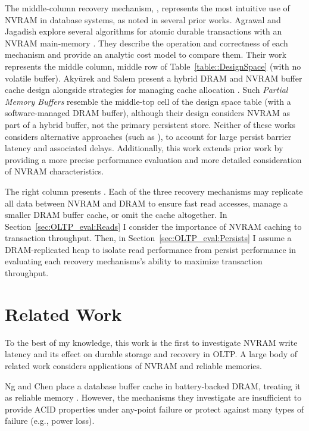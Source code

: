 The middle-column recovery mechanism, \InPlace, represents the most intuitive use of NVRAM in database systems, as noted in several prior works.
Agrawal and Jagadish explore several algorithms for atomic durable transactions with an NVRAM main-memory \cite{AgrawalJagadish89}.
They describe the operation and correctness of each mechanism and provide an analytic cost model to compare them.
Their work represents the middle column, middle row of Table~\ref{table::DesignSpace} (\InPlace with no volatile buffer).
Aky\"{u}rek and Salem present a hybrid DRAM and NVRAM buffer cache design alongside strategies for managing cache allocation \cite{SalemAkyrek95}.
Such \emph{Partial Memory Buffers} resemble the middle-top cell of the design space table (\InPlace with a software-managed DRAM buffer), although their design considers NVRAM as part of a hybrid buffer, not the primary persistent store.
Neither of these works considers alternative approaches (such as \GroupCommit), to account for large persist barrier latency and associated delays.
Additionally, this work extends prior work by providing a more precise performance evaluation and more detailed consideration of NVRAM characteristics.

The right column presents \GroupCommit.
Each of the three recovery mechanisms may replicate all data between NVRAM and DRAM to ensure fast read accesses, manage a smaller DRAM buffer cache, or omit the cache altogether.
In Section~\ref{sec:OLTP_eval:Reads} I consider the importance of NVRAM caching to transaction throughput.
Then, in Section~\ref{sec:OLTP_eval:Persists} I assume a DRAM-replicated heap to isolate read performance from persist performance in evaluating each recovery mechanisms's ability to maximize transaction throughput.

\section{Related Work}
\label{sec:OLTP_design:RelatedWork}
To the best of my knowledge, this work is the first to investigate NVRAM write latency and its effect on durable storage and recovery in OLTP.
A large body of related work considers applications of NVRAM and reliable memories.

Ng and Chen place a database buffer cache in battery-backed DRAM, treating it as reliable memory \cite{NgChen97}.
However, the mechanisms they investigate are insufficient to provide ACID properties under any-point failure or protect against many types of failure (e.g., power loss).

